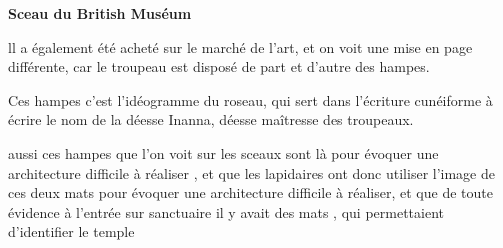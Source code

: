 \documentclass[a4paper]{article}
\begin{document}
{
\textbf{Sceau du British Muséum}}


\bigskip


\bigskip


\bigskip


\bigskip

{
ll a également été acheté sur le marché de l'art, et on voit une mise en page différente, car le troupeau est disposé de
part et d'autre des hampes.}

{
Ces hampes c'est l'idéogramme du roseau, qui sert dans l'écriture cunéiforme à écrire le nom de la déesse Inanna, déesse
maîtresse des troupeaux.}

{
aussi ces hampes que l'on voit sur les sceaux sont là pour évoquer une architecture difficile à réaliser , et que les
lapidaires ont donc utiliser l'image de ces deux mats pour évoquer une architecture difficile à réaliser, et que de
toute évidence à l'entrée sur sanctuaire il y avait des mats , qui permettaient d'identifier le temple}


\bigskip


\bigskip


\bigskip


\bigskip


\bigskip


\bigskip


\bigskip


\bigskip


\bigskip


\bigskip


\bigskip


\bigskip


\bigskip


\bigskip


\bigskip


\bigskip


\bigskip


\bigskip


\bigskip


\bigskip


\bigskip


\bigskip


\bigskip


\bigskip


\bigskip


\bigskip


\bigskip


\bigskip


\bigskip
\end{document}
